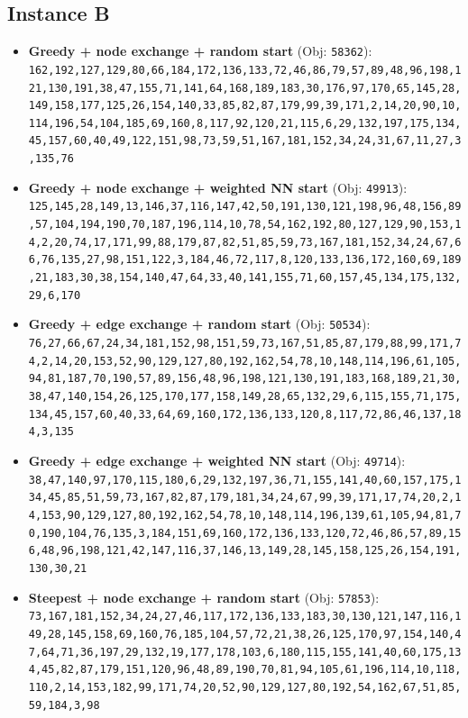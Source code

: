 \subsection{Instance B}
\begin{itemize}[leftmargin=1.5em]
    \item \textbf{Greedy + node exchange + random start} (Obj: \texttt{58362}):\\
    \texttt{162,192,127,129,80,66,184,172,136,133,72,46,86,79,57,89,48,96,198,121,130,191,38,47,155,71,141,64,168,189,183,30,176,97,170,65,145,28,149,158,177,125,26,154,140,33,85,82,87,179,99,39,171,2,14,20,90,10,114,196,54,104,185,69,160,8,117,92,120,21,115,6,29,132,197,175,134,45,157,60,40,49,122,151,98,73,59,51,167,181,152,34,24,31,67,11,27,3,135,76}
    \item \textbf{Greedy + node exchange + weighted NN start} (Obj: \texttt{49913}):\\
    \texttt{125,145,28,149,13,146,37,116,147,42,50,191,130,121,198,96,48,156,89,57,104,194,190,70,187,196,114,10,78,54,162,192,80,127,129,90,153,14,2,20,74,17,171,99,88,179,87,82,51,85,59,73,167,181,152,34,24,67,66,76,135,27,98,151,122,3,184,46,72,117,8,120,133,136,172,160,69,189,21,183,30,38,154,140,47,64,33,40,141,155,71,60,157,45,134,175,132,29,6,170}
    \item \textbf{Greedy + edge exchange + random start} (Obj: \texttt{50534}):\\
    \texttt{76,27,66,67,24,34,181,152,98,151,59,73,167,51,85,87,179,88,99,171,74,2,14,20,153,52,90,129,127,80,192,162,54,78,10,148,114,196,61,105,94,81,187,70,190,57,89,156,48,96,198,121,130,191,183,168,189,21,30,38,47,140,154,26,125,170,177,158,149,28,65,132,29,6,115,155,71,175,134,45,157,60,40,33,64,69,160,172,136,133,120,8,117,72,86,46,137,184,3,135}
    \item \textbf{Greedy + edge exchange + weighted NN start} (Obj: \texttt{49714}):\\
    \texttt{38,47,140,97,170,115,180,6,29,132,197,36,71,155,141,40,60,157,175,134,45,85,51,59,73,167,82,87,179,181,34,24,67,99,39,171,17,74,20,2,14,153,90,129,127,80,192,162,54,78,10,148,114,196,139,61,105,94,81,70,190,104,76,135,3,184,151,69,160,172,136,133,120,72,46,86,57,89,156,48,96,198,121,42,147,116,37,146,13,149,28,145,158,125,26,154,191,130,30,21}
    \item \textbf{Steepest + node exchange + random start} (Obj: \texttt{57853}):\\
    \texttt{73,167,181,152,34,24,27,46,117,172,136,133,183,30,130,121,147,116,149,28,145,158,69,160,76,185,104,57,72,21,38,26,125,170,97,154,140,47,64,71,36,197,29,132,19,177,178,103,6,180,115,155,141,40,60,175,134,45,82,87,179,151,120,96,48,89,190,70,81,94,105,61,196,114,10,118,110,2,14,153,182,99,171,74,20,52,90,129,127,80,192,54,162,67,51,85,59,184,3,98}

\end{itemize}
